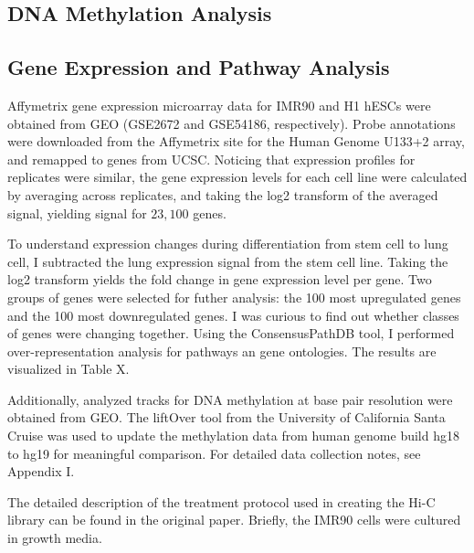 \documentclass[phd,tocprelim]{cornell}
\begin{document}
\subsection{DNA Methylation Analysis}


\subsection{Gene Expression and Pathway Analysis}

Affymetrix gene expression microarray data for IMR90 and H1 hESCs were obtained from GEO (GSE2672\cite{kim2005}
and GSE54186\cite{kim2014}, respectively).  Probe annotations were downloaded from the Affymetrix site for
the Human Genome U133+2 array, and remapped to genes from UCSC.  Noticing that expression profiles for replicates
were similar, the gene expression levels for each cell line were calculated by averaging across replicates, and
taking the log2 transform of the averaged signal, yielding signal for $23,100$ genes.


To understand expression changes during differentiation from stem cell to lung cell, I subtracted the lung expression
signal from the stem cell line.  Taking the log2 transform yields the fold change in gene expression level per gene.
Two groups of genes were selected for futher analysis: the 100 most upregulated genes and the 100 most downregulated
genes.  I was curious to find out whether classes of genes were changing together.  Using the ConsensusPathDB
tool\cite{kamburov2013}, I performed over-representation analysis for pathways an gene ontologies.  The results are 
visualized in Table X.

\begin{table}
\end{table}



Additionally, analyzed tracks for DNA methylation at base pair
resolution were obtained from GEO\cite{lister2009}.  The liftOver tool from
the University of California Santa Cruise was used to update the methylation
data from human genome build hg18 to hg19 for meaningful comparison\cite{hinrichs2006}.
For detailed data collection notes, see Appendix I.

The detailed description of the treatment protocol used in creating the Hi-C
library can be found in the original paper\cite{ren2013}.  Briefly, the IMR90
cells were cultured in growth media.
\end{document}
